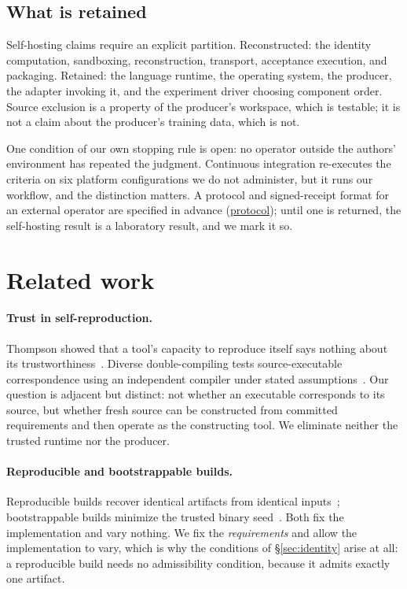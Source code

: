 \documentclass[10pt,twocolumn,letterpaper]{article}
\newcommand{\art}[2]{\href{https://github.com/rz4/reticuli/blob/5318acaac34ef99eeba9ff064a995a6313cc70ec/#1}{#2}}
\begin{document}
\subsection{What is retained}
Self-hosting claims require an explicit partition. Reconstructed: the identity computation, sandboxing, reconstruction, transport, acceptance execution, and packaging. Retained: the language runtime, the operating system, the producer, the adapter invoking it, and the experiment driver choosing component order. Source exclusion is a property of the producer's workspace, which is testable; it is not a claim about the producer's training data, which is not.

One condition of our own stopping rule is open: no operator outside the authors' environment has repeated the judgment. Continuous integration re-executes the criteria on six platform configurations we do not administer, but it runs our workflow, and the distinction matters. A protocol and signed-receipt format for an external operator are specified in advance (\art{research/harness/closure/outside.md}{protocol}); until one is returned, the self-hosting result is a laboratory result, and we mark it so.

\section{Related work}
\paragraph{Trust in self-reproduction.} Thompson showed that a tool's capacity to reproduce itself says nothing about its trustworthiness~\cite{thompson}. Diverse double-compiling tests source-executable correspondence using an independent compiler under stated assumptions~\cite{wheeler}. Our question is adjacent but distinct: not whether an executable corresponds to its source, but whether fresh source can be constructed from committed requirements and then operate as the constructing tool. We eliminate neither the trusted runtime nor the producer.

\paragraph{Reproducible and bootstrappable builds.} Reproducible builds recover identical artifacts from identical inputs~\cite{builds}; bootstrappable builds minimize the trusted binary seed~\cite{bootstrappable}. Both fix the implementation and vary nothing. We fix the \emph{requirements} and allow the implementation to vary, which is why the conditions of §\ref{sec:identity} arise at all: a reproducible build needs no admissibility condition, because it admits exactly one artifact.
\end{document}
